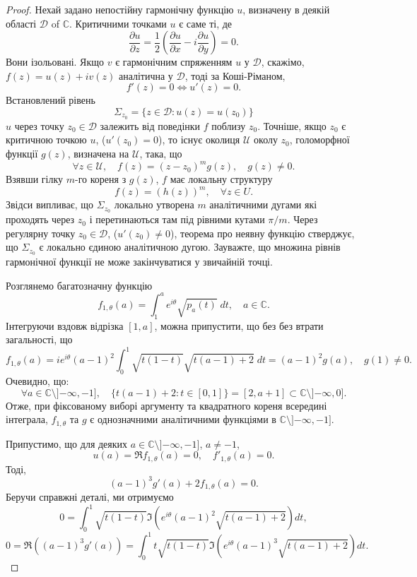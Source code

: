 \documentclass[]{article}
\theoremstyle{plain}
\begin{document}
\begin{proof}
Нехай задано непостійну гармонічну функцію $u$, визначену в деякій області $\mathcal{D}$ of $\mathbb{C}$. Критичними точками $u$ є саме ті, де
\begin{equation*}
    \frac{\partial u}{\partial z} = \frac{1}{2} \left( \frac{\partial u}{\partial x} - i \frac{\partial u}{\partial y} \right) = 0.
\end{equation*}
Вони ізольовані. Якщо $v$ є гармонічним спряженням $u$ у $\mathcal{D}$, скажімо, $f(z) = u(z) + iv(z)$ аналітична у $\mathcal{D}$, тоді за Коші-Ріманом,
\[ f'(z) = 0 \iff u'(z) = 0. \]
Встановлений рівень
\[ \Sigma_{z_0} = \{ z \in \mathcal{D} : u(z) = u(z_0) \} \]
$u$ через точку $z_0 \in \mathcal{D}$ залежить від поведінки $f$ поблизу $z_0$. Точніше, якщо $z_0$ є критичною точкою $u$, ($u'(z_0) = 0$), то існує околиця $\mathcal{U}$ околу $z_0$, голоморфної функції $g(z)$, визначена на $\mathcal{U}$, така, що
\[ \forall z \in \mathcal{U}, \quad f(z) = (z - z_0)^m g(z), \quad g(z) \neq 0. \]
Взявши гілку $m$-го кореня з $g(z)$, $f$ має локальну структуру
\[ f(z) = (h(z))^m, \quad \forall z \in U. \]
Звідси випливає, що $\Sigma_{z_0}$ локально утворена $m$ аналітичними дугами які проходять через $z_0$ і перетинаються там під рівними кутами $\pi/m$. Через регулярну точку $z_0 \in \mathcal{D}$, ($u'(z_0) \neq 0$), теорема про неявну функцію стверджує, що $\Sigma_{z_0}$ є локально єдиною аналітичною дугою. Зауважте, що множина рівнів гармонічної функції не може закінчуватися у звичайній точці.

Розглянемо багатозначну функцію
\[ f_{1,\theta}(a) = \int_{1}^{a} e^{i\theta} \sqrt{p_a(t)} \; dt, \quad a \in \mathbb{C}. \]
Інтегруючи вздовж відрізка $[1, a]$, можна припустити, що без без втрати загальності, що
\begin{equation}\label{eq:formula1}
    f_{1,\theta}(a) = i e^{i\theta} (a - 1)^2 
\int_{0}^{1} \sqrt{t(1 - t)} \sqrt{t(a - 1) + 2} \; dt = (a - 1)^2 g(a), \quad g(1) \neq 0.
\end{equation}
Очевидно, що:
\[ \forall a \in \mathbb{C} \setminus ]{-\infty}, -1], \quad \{ t(a - 1) + 2 : t \in [0, 1] \} = [2, a + 1] \subset \mathbb{C} \setminus ]{-\infty}, 0]. \]
Отже, при фіксованому виборі аргументу та квадратного кореня всередині інтеграла, $f_{1,\theta}$ та $g$ є однозначними аналітичними функціями в $\mathbb{C} \setminus ]{-\infty}, -1]$.

Припустимо, що для деяких $a \in \mathbb{C} \setminus ]{-\infty}, -1]$, $a \neq -1$,
\[ u(a) = \Re f_{1,\theta}(a) = 0, \quad f'_{1,\theta}(a) = 0. \]
Тоді,
\[ (a - 1)^3 g'(a) + 2f_{1,\theta}(a) = 0. \]
Беручи справжні деталі, ми отримуємо
\[ 0 = \int_{0}^{1} \sqrt{t(1 - t)} 
\Im \left( e^{i\theta} (a - 1)^2 \sqrt{t(a - 1) + 2} \right) dt, \]
\[ 0 = \Re \left( (a - 1)^3 g'(a) \right) = \int_{0}^{1} t \sqrt{t(1 - t)} 
\Im \left( e^{i\theta} (a - 1)^3 \sqrt{t(a - 1) + 2} \right) dt. \]


\end{proof}
\end{document}
